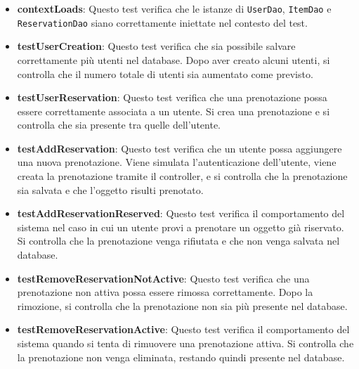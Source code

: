 \documentclass[twoside,openright,titlepage,fleqn,headinclude,12pt,a4paper,BCOR=5mm,footinclude]{scrbook}
\begin{document}
\begin{itemize}
    \item \textbf{contextLoads}: Questo test verifica che le istanze di \texttt{UserDao}, \texttt{ItemDao} e \texttt{ReservationDao} siano correttamente iniettate nel contesto del test.

    \item \textbf{testUserCreation}: Questo test verifica che sia possibile salvare correttamente più utenti nel database. Dopo aver creato alcuni utenti, si controlla che il numero totale di utenti sia aumentato come previsto.

    \item \textbf{testUserReservation}: Questo test verifica che una prenotazione possa essere correttamente associata a un utente. Si crea una prenotazione e si controlla che sia presente tra quelle dell’utente.

    \item \textbf{testAddReservation}: Questo test verifica che un utente possa aggiungere una nuova prenotazione. Viene simulata l’autenticazione dell’utente, viene creata la prenotazione tramite il controller, e si controlla che la prenotazione sia salvata e che l’oggetto risulti prenotato.

    \item \textbf{testAddReservationReserved}: Questo test verifica il comportamento del sistema nel caso in cui un utente provi a prenotare un oggetto già riservato. Si controlla che la prenotazione venga rifiutata e che non venga salvata nel database.

    \item \textbf{testRemoveReservationNotActive}: Questo test verifica che una prenotazione non attiva possa essere rimossa correttamente. Dopo la rimozione, si controlla che la prenotazione non sia più presente nel database.

    \item \textbf{testRemoveReservationActive}: Questo test verifica il comportamento del sistema quando si tenta di rimuovere una prenotazione attiva. Si controlla che la prenotazione non venga eliminata, restando quindi presente nel database.
\end{itemize}

\bigskip
\end{document}
